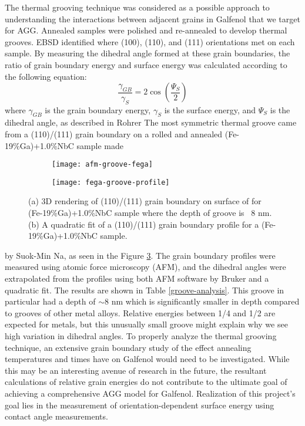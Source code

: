 The thermal grooving technique was considered as a possible approach to understanding the interactions between adjacent grains in Galfenol that we target for AGG. Annealed samples were polished and re-annealed to develop thermal grooves. EBSD identified where \hkl(100), \hkl(110), and \hkl(111) orientations met on each sample. By measuring the dihedral angle formed at these grain boundaries, the ratio of grain boundary energy and surface energy was calculated according to the following equation: 
\begin{equation}
\frac{\gamma_{GB}}{\gamma_{S}} = 2\cos\left(\frac{\Psi_{S}}{2}\right) 
\end{equation}
where $\gamma_{GB}$ is the grain boundary energy, $\gamma_{S}  $ is the surface energy, and $\Psi_{S} $ is the dihedral angle, as described in Rohrer \etal\cite{Rohrer2010a} The most symmetric thermal groove came from a \hkl(110)/\hkl(111) grain boundary on a rolled and annealed (Fe-19\%Ga)+1.0\%NbC sample made 
\begin{figure}[h!]
	\centering
	\begin{subfigure}[c]{0.45\textwidth}
		\texttt{[image: afm-groove-fega]}
		\subcaption{~}
		\label{fig:afm-groove-fega}		
	\end{subfigure}
	\begin{subfigure}[c]{0.45\textwidth} 
		\texttt{[image: fega-groove-profile]}
		\subcaption{~}
		\label{fig:fega-groove-profile}		
	\end{subfigure}
	\caption{(a) 3D rendering of (110)/(111) grain boundary on surface of  for (Fe-19\%Ga)+1.0\%NbC sample where the depth of groove is ~8 nm. (b) A quadratic fit of a (110)/(111) grain boundary profile for a (Fe-19\%Ga)+1.0\%NbC sample.}
	\label{fig:thermal-groove}
\end{figure}
by Suok-Min Na, as seen in the Figure \ref{fig:thermal-groove}.  The grain boundary profiles were measured using atomic force microscopy (AFM), and the dihedral angles were extrapolated from the profiles using both AFM software by Bruker and a quadratic fit.  The results are shown in Table \ref{groove-analysis}. This groove in particular had a depth of $\sim$8 nm which is significantly smaller in depth compared to grooves of other metal alloys.\cite{Skidmore2004a} Relative energies between 1/4 and 1/2 are expected for metals, but this unusually small groove might explain why we see high variation in dihedral angles. 
To properly analyze the thermal grooving technique, an extensive grain boundary study of the effect annealing temperatures and times have on Galfenol would need to be investigated. While this may be an interesting avenue of research in the future, the resultant calculations of relative grain energies do not contribute to the ultimate goal of achieving a comprehensive AGG model for Galfenol. Realization of this project's goal lies in the measurement of orientation-dependent surface energy using contact angle measurements. 


